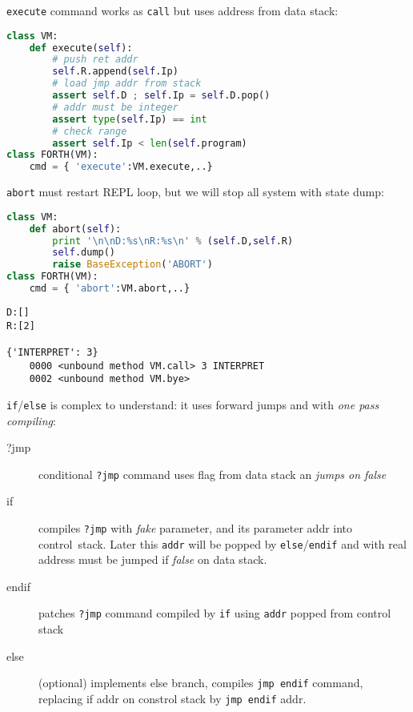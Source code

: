 \clearpage
\verb|execute| command works as \verb|call| but uses address from data stack:

\begin{lstlisting}[language=Python]
class VM:
	def execute(self):
		# push ret addr
		self.R.append(self.Ip)					
		# load jmp addr from stack
		assert self.D ; self.Ip = self.D.pop()	
		# addr must be integer
		assert type(self.Ip) == int				
		# check range
		assert self.Ip < len(self.program)		
class FORTH(VM):
	cmd = { 'execute':VM.execute,..} 
\end{lstlisting}

\clearpage
\verb|abort| must restart REPL loop, but we will stop all system with state
dump:
\begin{lstlisting}[language=Python]
class VM:
	def abort(self):
		print '\n\nD:%s\nR:%s\n' % (self.D,self.R)
		self.dump()
		raise BaseException('ABORT')
class FORTH(VM):
	cmd = { 'abort':VM.abort,..} 
\end{lstlisting}
\begin{lstlisting}
D:[]
R:[2]

{'INTERPRET': 3}
	0000 <unbound method VM.call> 3 INTERPRET 
	0002 <unbound method VM.bye> 
\end{lstlisting}
		
\clearpage
\noindent
\verb|if|/\verb|else| is complex to understand: it uses forward jumps and
 with \emph{one pass compiling}:
\begin{description}
\item[?jmp] conditional \verb|?jmp| command uses flag from data stack an
\emph{jumps on false}
\item[if] compiles \verb|?jmp| with \emph{fake} parameter, and  its
parameter addr into control\ stack. Later this \verb|addr| will be popped by
\verb|else|/\verb|endif| and  with real address must be
jumped if \emph{false} on data stack.
\item[endif] patches \verb|?jmp| command compiled by \verb|if| using
\verb|addr| popped from control stack
\item[else] (optional) implements else branch, compiles \verb|jmp endif|
command, replacing if addr on constrol stack by \verb|jmp endif| addr.
\end{description}

